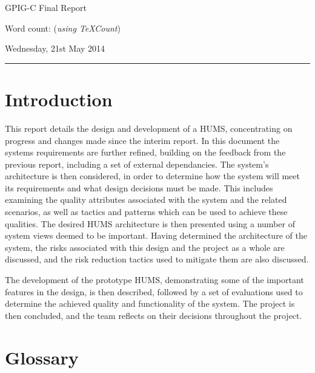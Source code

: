 \documentclass[10pt,a4paper]{article}
\begin{document}
\begin{center}
{\vspace*{-0.5cm}
\Huge GPIG-C Final Report}
\vspace*{0.2cm}

Word count:  (\textit{using TeXCount})
\vspace*{0.1cm}

Wednesday, 21st May 2014
\end{center}
\vspace*{0.4cm}
\hrule
\vspace*{0.4cm}

\section{Introduction}
\label{sec:intro}
This report details the design and development of a HUMS, concentrating on progress and changes made since the interim report. In this document the systems requirements are further refined, building on the feedback from the previous report, including a set of external dependancies. The system's architecture is then considered, in order to determine how the system will meet its requirements and what design decisions must be made. This includes examining the quality attributes associated with the system and the related scenarios, as well as tactics and patterns which can be used to achieve these qualities. The desired HUMS architecture is then presented using a number of system views deemed to be important. Having determined the architecture of the system, the risks associated with this design and the project as a whole are discussed, and the risk reduction tactics used to mitigate them are also discussed.

The development of the prototype HUMS, demonstrating some of the important features in the design, is then described, followed by a set of evaluations used to determine the achieved quality and functionality of the system. The project is then concluded, and the team reflects on their decisions throughout the project.

\section{Glossary}
\label{sec:glossary}
\end{document}
